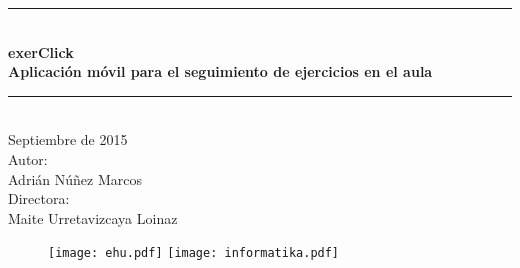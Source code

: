 \pagestyle{empty}

\newcommand{\HRule}{\rule{\linewidth}{0.5mm}} 

\begin{center}
	\HRule \\[0.5cm]
	\vspace{0.5cm}
	\textbf {
		{\huge exerClick}\\
		\vspace{0.3 cm}
		Aplicación móvil para el seguimiento de ejercicios en el aula\\
	}
	\vspace{0.5cm}
	\HRule \\[2.0cm]
	{\large
		Septiembre de 2015\\
		\vspace{2.0 cm}
		Autor:\\
		Adrián Núñez Marcos\\
		\vspace{1.0 cm}
		Directora:\\
		Maite Urretavizcaya Loinaz\\
	}

	\vspace{2.0 cm} 
	\begin{figure}[h!]
		\centering
		\texttt{[image: ehu.pdf]}\hfill
		\texttt{[image: informatika.pdf]}
	\end{figure}
\end{center}
